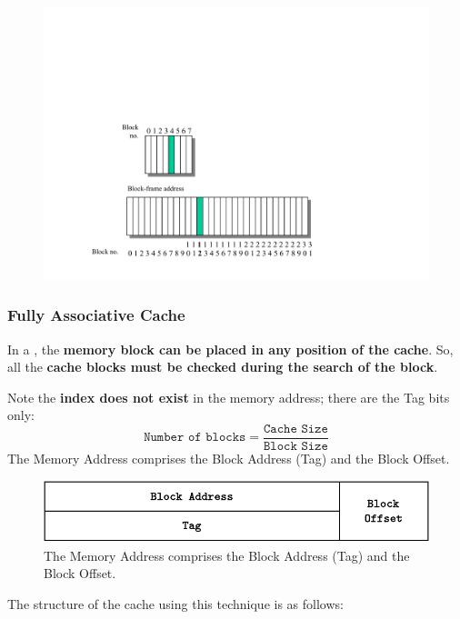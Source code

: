 \begin{figure}[!htp]
    \centering
    \includegraphics[width=.8\textwidth]{img/direct-mapped-cache-3.pdf}
\end{figure}

\newpage

\subsubsection*{\textcolor{Red2}{Fully Associative Cache}}\label{Fully Associative Cache}

In a , the \textbf{memory block can be placed in any position of the cache}. So, all the \textbf{cache blocks must be checked during the search of the block}.

\highspace
Note the \textbf{index does not exist} in the memory address; there are the Tag bits only:
\begin{equation}\label{eq: Fully Associative Cache}
    \texttt{Number of blocks} = \dfrac{\texttt{Cache Size}}{\texttt{Block Size}}
\end{equation}
The Memory Address comprises the Block Address (Tag) and the Block Offset.

\begin{figure}[!htp]
    \centering
    \includegraphics[width=.9\textwidth]{img/fully-associative-cache-1.pdf}
    \caption{The Memory Address comprises the Block Address (Tag) and the Block Offset.}
\end{figure}

\noindent
The structure of the cache using this technique is as follows:

